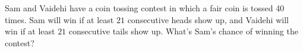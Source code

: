 Sam and Vaidehi have a coin tossing contest in which a fair coin is tossed 40 times. Sam will win if at least $21$ consecutive heads show up, and Vaidehi will win if at least $21$ consecutive tails show up. What's Sam's chance of winning the contest?
